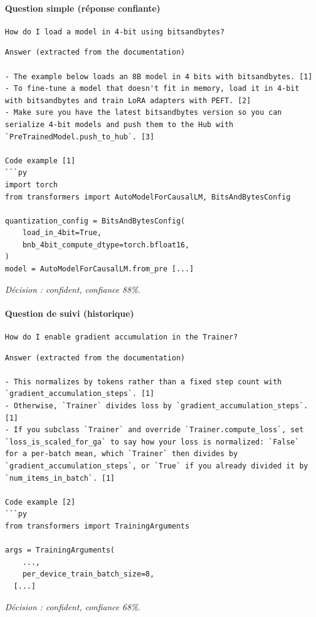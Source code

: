 \paragraph{Question simple (réponse confiante)}
\begin{lstlisting}
How do I load a model in 4-bit using bitsandbytes?
\end{lstlisting}
\begin{lstlisting}[backgroundcolor=\color{black!5}]
Answer (extracted from the documentation)

- The example below loads an 8B model in 4 bits with bitsandbytes. [1]
- To fine-tune a model that doesn't fit in memory, load it in 4-bit with bitsandbytes and train LoRA adapters with PEFT. [2]
- Make sure you have the latest bitsandbytes version so you can serialize 4-bit models and push them to the Hub with `PreTrainedModel.push_to_hub`. [3]

Code example [1]
```py
import torch
from transformers import AutoModelForCausalLM, BitsAndBytesConfig

quantization_config = BitsAndBytesConfig(
    load_in_4bit=True,
    bnb_4bit_compute_dtype=torch.bfloat16,
)
model = AutoModelForCausalLM.from_pre [...]
\end{lstlisting}
\noindent\textit{Décision : confident, confiance 88\%}.

\paragraph{Question de suivi (historique)}
\begin{lstlisting}
How do I enable gradient accumulation in the Trainer?
\end{lstlisting}
\begin{lstlisting}[backgroundcolor=\color{black!5}]
Answer (extracted from the documentation)

- This normalizes by tokens rather than a fixed step count with `gradient_accumulation_steps`. [1]
- Otherwise, `Trainer` divides loss by `gradient_accumulation_steps`. [1]
- If you subclass `Trainer` and override `Trainer.compute_loss`, set `loss_is_scaled_for_ga` to say how your loss is normalized: `False` for a per-batch mean, which `Trainer` then divides by `gradient_accumulation_steps`, or `True` if you already divided it by `num_items_in_batch`. [1]

Code example [2]
```py
from transformers import TrainingArguments

args = TrainingArguments(
    ...,
    per_device_train_batch_size=8,
  [...]
\end{lstlisting}
\noindent\textit{Décision : confident, confiance 68\%}.

